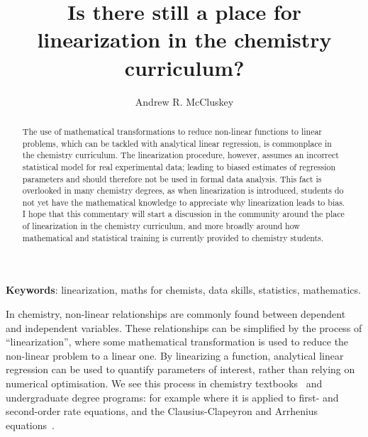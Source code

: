 \documentclass[journal=jceda8,manuscript=article]{achemso}
\author{Andrew R. McCluskey}
\affiliation{School of Chemistry, University of Bristol, Cantock's Close, Bristol, BS8 1TS, United Kingdom}
\title{Is there still a place for linearization in the chemistry curriculum?}
\begin{document}
\begin{abstract}
    The use of mathematical transformations to reduce non-linear functions to linear problems, which can be tackled with analytical linear regression, is commonplace in the chemistry curriculum. 
    The linearization procedure, however, assumes an incorrect statistical model for real experimental data; leading to biased estimates of regression parameters and should therefore not be used in formal data analysis. 
    This fact is overlooked in many chemistry degrees, as when linearization is introduced, students do not yet have the mathematical knowledge to appreciate why linearization leads to bias.
    I hope that this commentary will start a discussion in the community around the place of linearization in the chemistry curriculum, and more broadly around how mathematical and statistical training is currently provided to chemistry students. 
\end{abstract}

\noindent\textbf{Keywords}: linearization, maths for chemists, data skills, statistics, mathematics.

\maketitle 

In chemistry, non-linear relationships are commonly found between dependent and independent variables.
These relationships can be simplified by the process of ``linearization'', where some mathematical transformation is used to reduce the non-linear problem to a linear one. 
By linearizing a function, analytical linear regression can be used to quantify parameters of interest, rather than relying on numerical optimisation. 
We see this process in chemistry textbooks~\cite{monk_math_2010,atkins_physical_2018} and undergraduate degree programs: for example where it is applied to first- and second-order rate equations, and the Clausius-Clapeyron and Arrhenius equations~\cite{perrin_linear_2017,monk_math_2010}.
\end{document}
